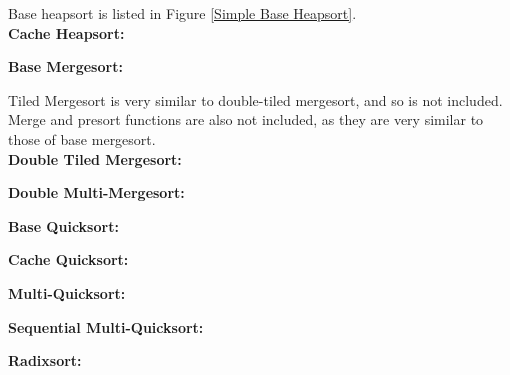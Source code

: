 Base heapsort is listed in Figure \ref{Simple Base Heapsort}.\\
\textbf{Cache Heapsort:}

\textbf{Base Mergesort:}

Tiled Mergesort is very similar to double-tiled mergesort, and so is not
included. Merge and presort functions are also not included, as they are very
similar to those of base mergesort.\\
\textbf{Double Tiled Mergesort:}

\textbf{Double Multi-Mergesort:}

\textbf{Base Quicksort:}

\textbf{Cache Quicksort:}

\textbf{Multi-Quicksort:}

\textbf{Sequential Multi-Quicksort:}

\textbf{Radixsort:}
